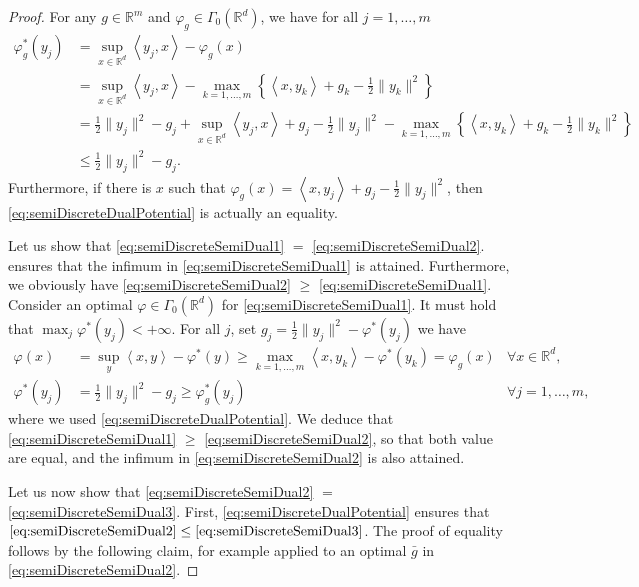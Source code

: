 \documentclass[11pt]{article}
\newcommand{\R}{\mathbb R}
\newcommand{\1}{\mathbbm{1}}
\numberwithin{equation}{section}
\begin{document}
\begin{proof}
    For any $g \in \R^m$ and $\varphi_g \in \Gamma_0(\R^d)$, we have for all $j = 1,\ldots, m$
    \begin{align}
        \label{eq:semiDiscreteDualPotential}
        \varphi_g^*(y_j) &= \sup_{x \in \R^d} \left\langle y_j,x \right\rangle - \varphi_g(x) \nonumber\\
        &= \sup_{x \in \R^d} \left\langle y_j,x \right\rangle - \max_{k=1,\ldots,m} \left\{\left\langle x, y_k\right\rangle  + g_k-\frac{1}{2}\|y_k\|^2\right\}\nonumber\\
        &=\frac{1}{2}\|y_j\|^2 - g_j + \sup_{x \in \R^d} \left\langle y_j,x \right\rangle   + g_j-\frac{1}{2}\|y_j\|^2 - \max_{k=1,\ldots,m} \left\{\left\langle x, y_k\right\rangle  + g_k-\frac{1}{2}\|y_k\|^2\right\}\nonumber\\
        &\leq \frac{1}{2}\|y_j\|^2 - g_j.
    \end{align}
    Furthermore, if there is $x$ such that $\varphi_g(x) = \left\langle x, y_j\right\rangle + g_j - \frac{1}{2} \|y_j\|^2$, then \eqref{eq:semiDiscreteDualPotential} is actually an equality.

    Let us show that \eqref{eq:semiDiscreteSemiDual1} $=$ \eqref{eq:semiDiscreteSemiDual2}.  ensures that the infimum in \eqref{eq:semiDiscreteSemiDual1} is attained. Furthermore, we obviously have \eqref{eq:semiDiscreteSemiDual2} $ \geq$ \eqref{eq:semiDiscreteSemiDual1}.
    Consider an optimal $\varphi \in \Gamma_0(\R^d)$ for \eqref{eq:semiDiscreteSemiDual1}. It must hold that $\max_j \varphi^*(y_j) < + \infty$. For all $j$, set $g_j = \frac{1}{2} \|y_j\|^2 - \varphi^*(y_j)$ we have 
    \begin{align*}
        \varphi(x) &= \sup_y \left\langle x, y \right\rangle - \varphi^*(y) \geq \max_{k = 1,\ldots, m} \left\langle x, y_k \right\rangle - \varphi^*(y_k)  =\varphi_g(x) & \forall x \in \R^d, \nonumber\\
        \varphi^*(y_j) &= \frac{1}{2}\|y_j\|^2 - g_j \geq \varphi_g^*(y_j)& \forall j = 1,\ldots,m, 
    \end{align*}
    where we used \eqref{eq:semiDiscreteDualPotential}.
    We deduce that \eqref{eq:semiDiscreteSemiDual1} $\geq$ \eqref{eq:semiDiscreteSemiDual2}, so that both value are equal, and the infimum in \eqref{eq:semiDiscreteSemiDual2} is also attained.
    
    Let us now show that \eqref{eq:semiDiscreteSemiDual2} $=$ \eqref{eq:semiDiscreteSemiDual3}.
    First, \eqref{eq:semiDiscreteDualPotential} ensures that $\eqref{eq:semiDiscreteSemiDual2} \leq \eqref{eq:semiDiscreteSemiDual3}$. The proof of equality follows by the following claim, for example applied to an optimal $\bar{g}$ in \eqref{eq:semiDiscreteSemiDual2}.


\end{proof}
\end{document}
